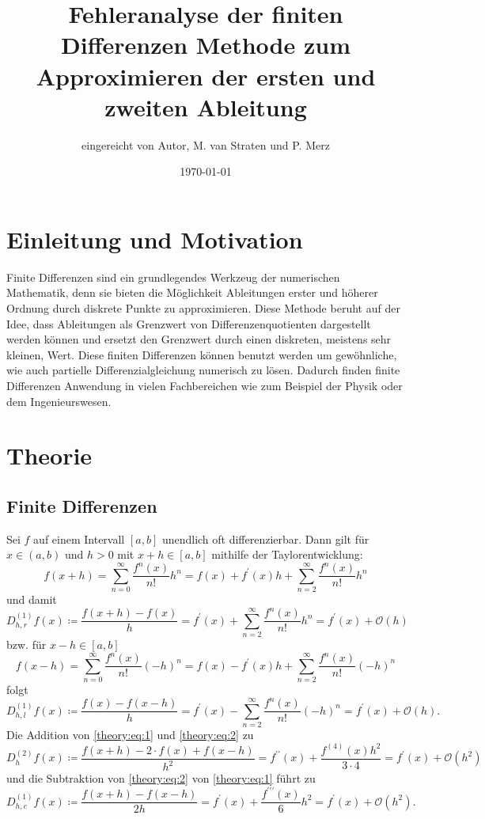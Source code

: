\documentclass{scrartcl}
\title{Fehleranalyse der finiten Differenzen Methode zum Approximieren der ersten und zweiten Ableitung}
\author{%
  eingereicht von Autor, M. van Straten und P. Merz
}
\date{\today}
\newcommand{\BigO}{\mathcal{O}}
\theoremstyle{remark}
\begin{document}
\maketitle
\tableofcontents
\cleardoublepage

\section{Einleitung und Motivation}
Finite Differenzen sind ein grundlegendes Werkzeug der numerischen Mathematik,
denn sie bieten die Möglichkeit Ableitungen erster und höherer Ordnung durch
diskrete Punkte zu approximieren. Diese Methode beruht auf der Idee, dass
Ableitungen als Grenzwert von Differenzenquotienten dargestellt werden können
und ersetzt den Grenzwert durch einen diskreten, meistens sehr kleinen, Wert.
Diese finiten Differenzen können benutzt werden um gewöhnliche, wie auch
partielle Differenzialgleichung numerisch zu lösen. Dadurch finden finite
Differenzen Anwendung in vielen Fachbereichen wie zum Beispiel der Physik oder
dem Ingenieurswesen. \cite{FiniteDifferenzen}

\section{Theorie}

\subsection{Finite Differenzen} %
Sei \(f\) auf einem Intervall \([a,b]\) unendlich oft differenzierbar. Dann
gilt für \(x \in (a,b)\) und \(h > 0\) mit \(x + h \in [a,b]\) mithilfe der
Taylorentwicklung:
\begin{equation} \label{theory:eq:1}
    f(x + h)
    = \sum_{n=0}^{\infty} \frac{f^n(x)}{n!} h^n
    = f(x) + f^\prime(x) h + \sum_{n=2}^\infty \frac{f^n(x)}{n!} h^n
\end{equation}
und damit
\[
    D_{h, r}^{(1)} f(x)
    \coloneq \frac{f(x + h) - f(x)}{h}
    = f^\prime(x) + \sum_{n=2}^\infty \frac{f^n(x)}{n!} h^n
    = f^\prime(x) + \BigO(h)
\]
bzw. für \(x - h \in [a,b]\)
\begin{equation} \label{theory:eq:2}
    f(x - h)
    = \sum_{n=0}^\infty \frac{f^n(x)}{n!} {(-h)}^n
    = f(x) - f^{\prime}(x)h + \sum_{n=2}^\infty \frac{f^n(x)}{n!} {(-h)}^n
\end{equation}
folgt
\[
    D_{h, l}^{(1)} f(x)
    \coloneq \frac{f(x) - f(x - h)}{h}
    = f^\prime(x) - \sum_{n=2}^\infty \frac{f^n(x)}{n!} {(-h)}^n
    = f^\prime(x) + \BigO(h).
\]
Die Addition von \autoref{theory:eq:1} und \autoref{theory:eq:2} zu
\[
    D_h^{(2)} f(x)
    \coloneq \frac{f(x + h) - 2 \cdot f(x) + f(x - h)}{h^2}
    = f^{\prime\prime}(x) + \frac{f^{(4)}(x) h^2}{3 \cdot 4}
    = f^\prime(x) + \BigO(h^2)
\]
und die Subtraktion von \autoref{theory:eq:2} von \autoref{theory:eq:1} führt
  zu
\[
    D_{h, c}^{(1)} f(x)
    \coloneq \frac{f(x + h) - f(x - h)}{2h}
    = f^\prime(x) + \frac{f^{\prime\prime\prime}(x)}{6} h^2
    = f^\prime(x) + \BigO(h^2).
\] \cite{NumericalDifferentiation}
\end{document}

